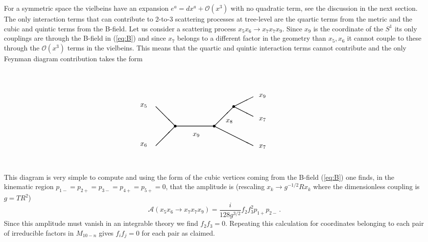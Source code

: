 \documentclass[a4paper,11pt]{article}
\begin{document}
For a symmetric space the vielbeins have an expansion $e^a=dx^a+\mathcal O(x^3)$ with no quadratic term, see the discussion in the next section. The only interaction terms that can contribute to 2-to-3 scattering processes at tree-level are the quartic terms from the metric and the cubic and quintic terms from the B-field. Let us consider a scattering process $x_5x_6\rightarrow x_7x_7x_9$. Since $x_9$ is the coordinate of the $S^1$ its only couplings are through the B-field in (\ref{eq:B}) and since $x_7$ belongs to a different factor in the geometry than $x_5,x_6$ it cannot couple to these through the $\mathcal O(x^3)$ terms in the vielbeins. This means that the quartic and quintic interaction terms cannot contribute and the only Feynman diagram contribution takes the form
$$
\setlength{\unitlength}{1cm}
\begin{picture}(17,5)(-1.5,0)
\thicklines
\put(3.2,3){$x_5$}
\put(3.2,1){$x_6$}
\put(4,3){\line(1,-1){1}}
\put(4,1){\line(1,1){1}}
\put(5,2){\circle*{0.15}}
\put(5,2){\line(1,0){2}}
\put(5.9,1.5){$x_9$}
\put(7,2){\circle*{0.15}}
\put(7,2){\line(1,1){1}}
\put(7.6,2.2){$x_8$}
\put(8,3){\line(2,1){1}}
\put(8,3){\line(2,-1){1}}
\put(8,3){\circle*{0.15}}
\put(9.3,3.5){$x_9$}
\put(9.3,2.3){$x_7$}
\put(7,2){\line(2,-1){2}}
\put(9.3,0.9){$x_7$}
\end{picture}
$$
This diagram is very simple to compute and using the form of the cubic vertices coming from the B-field (\ref{eq:B}) one finds, in the kinematic region $p_{1-}=p_{2+}=p_{3-}=p_{4+}=p_{5+}=0$, that the amplitude is (rescaling $x_k\rightarrow g^{-1/2}Rx_k$ where the dimensionless coupling is $g=TR^2$)
\begin{equation}
\mathcal A(x_5x_6\rightarrow x_7x_7x_9)=\frac{i}{128g^{3/2}}f_2f_3^2p_{1+}p_{2-}\,.
\end{equation}
Since this amplitude must vanish in an integrable theory we find $f_2f_3=0$. Repeating this calculation for coordinates belonging to each pair of irreducible factors in $M_{10-n}$ gives $f_if_j=0$ for each pair as claimed.

\iffalse
\end{document}

